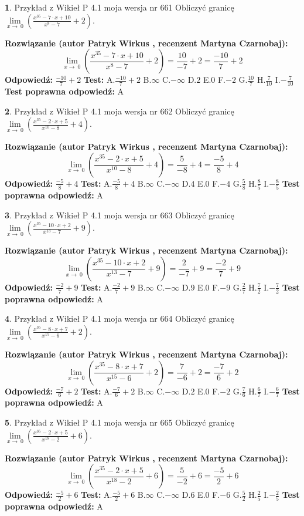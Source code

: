 \documentclass[12pt, a4paper]{article}
\theoremstyle{definition} %
\newtheorem{zad}{}
\newcommand{\zadStart}[1]{\begin{zad}#1\newline}
\newcommand{\zadStop}{\end{zad}}
\newcommand{\rozwStart}[2]{\noindent \textbf{Rozwiązanie (autor #1 , recenzent #2): }\newline}
\newcommand{\rozwStop}{\newline}
\newcommand{\odpStart}{\noindent \textbf{Odpowiedź:}\newline}
\newcommand{\odpStop}{\newline}
\newcommand{\testStart}{\noindent \textbf{Test:}\newline}
\newcommand{\testStop}{\newline}
\newcommand{\kluczStart}{\noindent \textbf{Test poprawna odpowiedź:}\newline}
\newcommand{\kluczStop}{\newline}
\begin{document}
\zadStart{Przykład z Wikieł P 4.1 moja wersja nr 661}
Obliczyć granicę $\lim\limits_{x\to\ 0}(\frac{x^{35}-7 \cdot x +10}{x^{8}-7}+2)$.
\zadStop
\rozwStart{Patryk Wirkus}{Martyna Czarnobaj}
$$\lim\limits_{x\to\ 0}(\frac{x^{35}-7 \cdot x +10}{x^{8}-7}+2)=\frac{10}{-7}+2=\frac{-10}{7}+2$$
\rozwStop
\odpStart
$\frac{-10}{7}+2$
\odpStop
\testStart
A.$\frac{-10}{7}+2$
B.$\infty$
C.$-\infty$
D.$2$
E.$0$
F.$-2$
G.$\frac{10}{7}$
H.$\frac{7}{10}$
I.$-\frac{7}{10}$
\testStop
\kluczStart
A
\kluczStop



\zadStart{Przykład z Wikieł P 4.1 moja wersja nr 662}
Obliczyć granicę $\lim\limits_{x\to\ 0}(\frac{x^{35}-2 \cdot x +5}{x^{10}-8}+4)$.
\zadStop
\rozwStart{Patryk Wirkus}{Martyna Czarnobaj}
$$\lim\limits_{x\to\ 0}(\frac{x^{35}-2 \cdot x +5}{x^{10}-8}+4)=\frac{5}{-8}+4=\frac{-5}{8}+4$$
\rozwStop
\odpStart
$\frac{-5}{8}+4$
\odpStop
\testStart
A.$\frac{-5}{8}+4$
B.$\infty$
C.$-\infty$
D.$4$
E.$0$
F.$-4$
G.$\frac{5}{8}$
H.$\frac{8}{5}$
I.$-\frac{8}{5}$
\testStop
\kluczStart
A
\kluczStop



\zadStart{Przykład z Wikieł P 4.1 moja wersja nr 663}
Obliczyć granicę $\lim\limits_{x\to\ 0}(\frac{x^{35}-10 \cdot x +2}{x^{13}-7}+9)$.
\zadStop
\rozwStart{Patryk Wirkus}{Martyna Czarnobaj}
$$\lim\limits_{x\to\ 0}(\frac{x^{35}-10 \cdot x +2}{x^{13}-7}+9)=\frac{2}{-7}+9=\frac{-2}{7}+9$$
\rozwStop
\odpStart
$\frac{-2}{7}+9$
\odpStop
\testStart
A.$\frac{-2}{7}+9$
B.$\infty$
C.$-\infty$
D.$9$
E.$0$
F.$-9$
G.$\frac{2}{7}$
H.$\frac{7}{2}$
I.$-\frac{7}{2}$
\testStop
\kluczStart
A
\kluczStop



\zadStart{Przykład z Wikieł P 4.1 moja wersja nr 664}
Obliczyć granicę $\lim\limits_{x\to\ 0}(\frac{x^{35}-8 \cdot x +7}{x^{15}-6}+2)$.
\zadStop
\rozwStart{Patryk Wirkus}{Martyna Czarnobaj}
$$\lim\limits_{x\to\ 0}(\frac{x^{35}-8 \cdot x +7}{x^{15}-6}+2)=\frac{7}{-6}+2=\frac{-7}{6}+2$$
\rozwStop
\odpStart
$\frac{-7}{6}+2$
\odpStop
\testStart
A.$\frac{-7}{6}+2$
B.$\infty$
C.$-\infty$
D.$2$
E.$0$
F.$-2$
G.$\frac{7}{6}$
H.$\frac{6}{7}$
I.$-\frac{6}{7}$
\testStop
\kluczStart
A
\kluczStop



\zadStart{Przykład z Wikieł P 4.1 moja wersja nr 665}
Obliczyć granicę $\lim\limits_{x\to\ 0}(\frac{x^{35}-2 \cdot x +5}{x^{18}-2}+6)$.
\zadStop
\rozwStart{Patryk Wirkus}{Martyna Czarnobaj}
$$\lim\limits_{x\to\ 0}(\frac{x^{35}-2 \cdot x +5}{x^{18}-2}+6)=\frac{5}{-2}+6=\frac{-5}{2}+6$$
\rozwStop
\odpStart
$\frac{-5}{2}+6$
\odpStop
\testStart
A.$\frac{-5}{2}+6$
B.$\infty$
C.$-\infty$
D.$6$
E.$0$
F.$-6$
G.$\frac{5}{2}$
H.$\frac{2}{5}$
I.$-\frac{2}{5}$
\testStop
\kluczStart
A
\kluczStop
\end{document}
